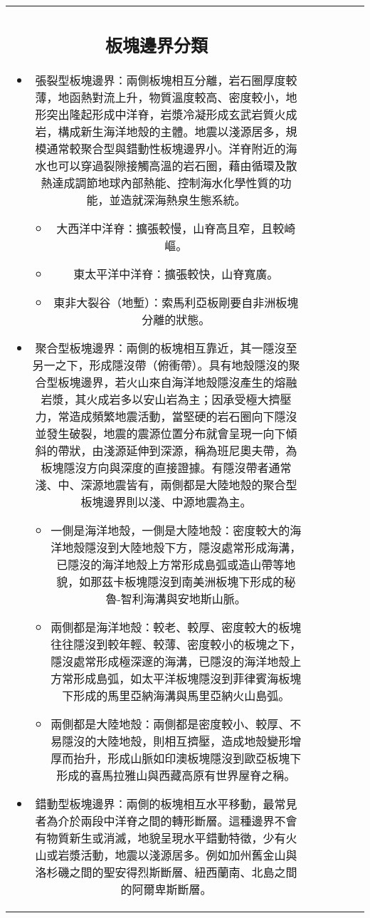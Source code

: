 \documentclass[a4paper,12pt]{report}
\begin{document}
\begin{tabular}{|c|c|c|c|c|c|}
\subsection{板塊邊界分類}
\begin{itemize}
\item 張裂型板塊邊界：兩側板塊相互分離，岩石圈厚度較薄，地函熱對流上升，物質溫度較高、密度較小，地形突出隆起形成中洋脊，岩漿冷凝形成玄武岩質火成岩，構成新生海洋地殼的主體。地震以淺源居多，規模通常較聚合型與錯動性板塊邊界小。洋脊附近的海水也可以穿過裂隙接觸高溫的岩石圈，藉由循環及散熱達成調節地球內部熱能、控制海水化學性質的功能，並造就深海熱泉生態系統。
\begin{itemize}
\item 大西洋中洋脊：擴張較慢，山脊高且窄，且較崎嶇。
\item 東太平洋中洋脊：擴張較快，山脊寬廣。
\item 東非大裂谷（地塹）：索馬利亞板剛要自非洲板塊分離的狀態。
\end{itemize}
\item 聚合型板塊邊界：兩側的板塊相互靠近，其一隱沒至另一之下，形成隱沒帶（俯衝帶）。具有地殼隱沒的聚合型板塊邊界，若火山來自海洋地殼隱沒產生的熔融岩漿，其火成岩多以安山岩為主；因承受極大擠壓力，常造成頻繁地震活動，當堅硬的岩石圈向下隱沒並發生破裂，地震的震源位置分布就會呈現一向下傾斜的帶狀，由淺源延伸到深源，稱為班尼奧夫帶，為板塊隱沒方向與深度的直接證據。有隱沒帶者通常淺、中、深源地震皆有，兩側都是大陸地殼的聚合型板塊邊界則以淺、中源地震為主。
\begin{itemize}
\item 一側是海洋地殼，一側是大陸地殼：密度較大的海洋地殼隱沒到大陸地殼下方，隱沒處常形成海溝，已隱沒的海洋地殼上方常形成島弧或造山帶等地貌，如那茲卡板塊隱沒到南美洲板塊下形成的秘魯-智利海溝與安地斯山脈。
\item 兩側都是海洋地殼：較老、較厚、密度較大的板塊往往隱沒到較年輕、較薄、密度較小的板塊之下，隱沒處常形成極深邃的海溝，已隱沒的海洋地殼上方常形成島弧，如太平洋板塊隱沒到菲律賓海板塊下形成的馬里亞納海溝與馬里亞納火山島弧。
\item 兩側都是大陸地殼：兩側都是密度較小、較厚、不易隱沒的大陸地殼，則相互擠壓，造成地殼變形增厚而抬升，形成山脈如印澳板塊隱沒到歐亞板塊下形成的喜馬拉雅山與西藏高原有世界屋脊之稱。
\end{itemize}
\item 錯動型板塊邊界：兩側的板塊相互水平移動，最常見者為介於兩段中洋脊之間的轉形斷層。這種邊界不會有物質新生或消滅，地貌呈現水平錯動特徵，少有火山或岩漿活動，地震以淺源居多。例如加州舊金山與洛杉磯之間的聖安得烈斯斷層、紐西蘭南、北島之間的阿爾卑斯斷層。
\end{itemize}

\end{tabular}
\end{document}
